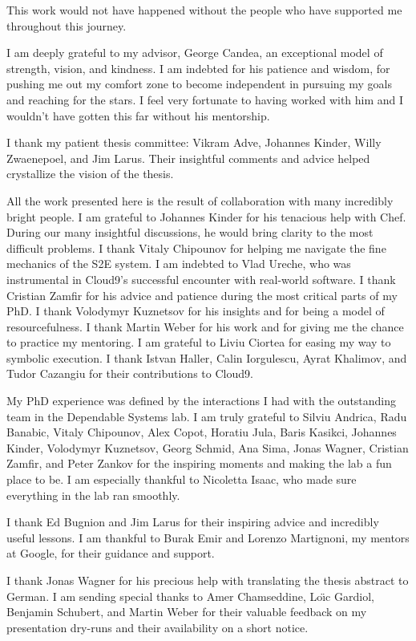 This work would not have happened without the people who have supported me throughout this journey.


I am deeply grateful to my advisor, George Candea, an exceptional model of strength, vision, and kindness.
%
I am indebted for his patience and wisdom, for pushing me out my comfort zone to become independent in pursuing my goals and reaching for the stars.  I feel very fortunate to having worked with him and I wouldn't have gotten this far without his mentorship.


I thank my patient thesis committee: Vikram Adve, Johannes Kinder, Willy Zwaenepoel, and Jim Larus.  Their insightful comments and advice helped crystallize the vision of the thesis.


All the work presented here is the result of collaboration with many incredibly bright people.
%
I am grateful to Johannes Kinder for his tenacious help with Chef.  During our many insightful discussions, he would bring clarity to the most difficult problems.
%
I thank Vitaly Chipounov for helping me navigate the fine mechanics of the S2E system.
%
I am indebted to Vlad Ureche, who was instrumental in Cloud9's successful encounter with real-world software.
%
I thank Cristian Zamfir for his advice and patience during the most critical parts of my PhD.
%
I thank Volodymyr Kuznetsov for his insights and for being a model of resourcefulness.
%
I thank Martin Weber for his work and for giving me the chance to practice my mentoring. 
%
I am grateful to Liviu Ciortea for easing my way to symbolic execution.
%
I thank Istvan Haller, Calin Iorgulescu, Ayrat Khalimov, and Tudor Cazangiu for their contributions to Cloud9.


My PhD experience was defined by the interactions I had with the outstanding team in the Dependable Systems lab.
%
I am truly grateful to Silviu Andrica, Radu Banabic, Vitaly Chipounov, Alex Copot, Horatiu Jula, Baris Kasikci, Johannes Kinder, Volodymyr Kuznetsov, Georg Schmid, Ana Sima, Jonas Wagner, Cristian Zamfir, and Peter Zankov for the inspiring moments and making the lab a fun place to be.
%
I am especially thankful to Nicoletta Isaac, who made sure everything in the lab ran smoothly.


I thank Ed Bugnion and Jim Larus for their inspiring advice and incredibly useful lessons.
%
I am thankful to Burak Emir and Lorenzo Martignoni, my mentors at Google, for their guidance and support.


I thank Jonas Wagner for his precious help with translating the thesis abstract to German.
%
I am sending special thanks to Amer Chamseddine, Lo\"{\i}c Gardiol, Benjamin Schubert, and Martin Weber for their valuable feedback on my presentation dry-runs and their availability on a short notice.



